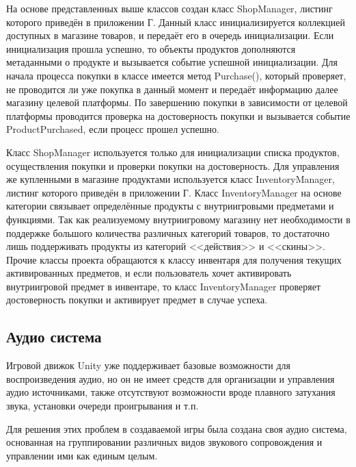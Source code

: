 На основе представленных выше классов создан класс ShopManager, листинг которого приведён в приложении Г. Данный класс инициализируется коллекцией доступных в магазине товаров, и передаёт его в очередь инициализации. Если инициализация прошла успешно, то объекты продуктов дополняются метаданными о продукте и вызывается событие успешной инициализации. Для начала процесса покупки в классе имеется метод Purchase(), который проверяет, не проводится ли уже покупка в данный момент и передаёт информацию далее магазину целевой платформы. По завершению покупки в зависимости от целевой платформы проводится проверка на достоверность покупки и вызывается событие ProductPurchased, если процесс прошел успешно.

Класс ShopManager используется только для инициализации списка продуктов, осуществления покупки и проверки покупки на достоверность. Для управления же купленными в магазине продуктами используется класс InventoryManager, листинг которого приведён в приложении Г. Класс InventoryManager на основе категории связывает определённые продукты с внутриигровыми предметами и функциями. Так как реализуемому внутриигровому магазину нет необходимости в поддержке большого количества различных категорий товаров, то достаточно лишь поддерживать продукты из категорий <<действия>> и <<скины>>. Прочие классы проекта обращаются к классу инвентаря для получения текущих активированных предметов, и если пользователь хочет активировать внутриигровой предмет в инвентаре, то класс InventoryManager проверяет достоверность покупки и активирует предмет в случае успеха.


\subsection{Аудио система}

Игровой движок Unity уже поддерживает базовые возможности для воспроизведения аудио, но он не имеет средств для организации и управления аудио источниками, также отсутствуют возможности вроде плавного затухания звука, установки очереди проигрывания и т.п.

Для решения этих проблем в создаваемой игры была создана своя аудио система, основанная на группировании различных видов звукового сопровождения и управлении ими как единым целым.

